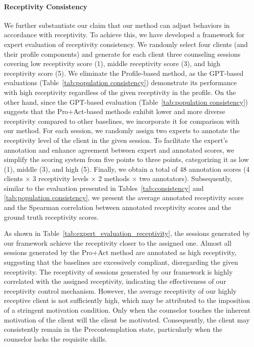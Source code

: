 \paragraph{Receptivity Consistency} We further substantiate our claim that our method can adjust behaviors in accordance with receptivity. To achieve this, we have developed a framework for expert evaluation of receptivity consistency. We randomly select four clients (and their profile components) and generate for each client three counseling sessions covering low receptivity score (1), middle receptivity score (3), and high receptivity score (5). We eliminate the Profile-based method, as the GPT-based evaluations (Table~\ref{tab:population consistency}) demonstrate its performance with high receptivity regardless of the given receptivity in the profile. On the other hand, since the GPT-based evaluation (Table~\ref{tab:population consistency}) suggests that the Pro+Act-based methods exhibit lower and more diverse receptivity compared to other baselines, we incorporate it for comparison with our method. For each session, we randomly assign two experts to annotate the receptivity level of the client in the given session. To facilitate the expert’s annotation and enhance agreement between expert and annotated scores, we simplify the scoring system from five points to three points, categorizing it as low (1), middle (3), and high (5). Finally, we obtain a total of 48 annotation scores (4 clients $\times$ 3 receptivity levels $\times$ 2 methods $\times$ two annotators). Subsequently, similar to the evaluation presented in Tables~\ref{tab:consistency} and \ref{tab:population consistency}, we present the average annotated receptivity score and the Spearman correlation between annotated receptivity scores and the ground truth receptivity scores.

As shown in Table~\ref{tab:expert_evaluation_receptivity}, the sessions generated by our framework achieve the receptivity closer to the assigned one. Almost all sessions generated by the Pro+Act method are annotated as high receptivity, suggesting that the baselines are excessively compliant, disregarding the given receptivity. The receptivity of sessions generated by our framework is highly correlated with the assigned receptivity, indicating the effectiveness of our receptivity control mechanism. However, the average receptivity of our highly receptive client is not sufficiently high, which may be attributed to the imposition of a stringent motivation condition. Only when the counselor touches the inherent motivation of the client will the client be motivated. Consequently, the client may consistently remain in the Precontemplation state, particularly when the counselor lacks the requisite skills.


